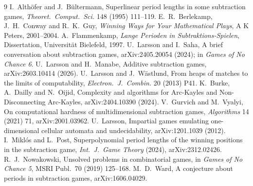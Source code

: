\begin{thebibliography}{9}
 I.~Althöfer and J.~Bültermann, Superlinear period lengths in some subtraction games,
\emph{Theoret.\ Comput.\ Sci.} 148 (1995) 111--119.
 E.~R.~Berlekamp, J.~H.~Conway and R.~K.~Guy, \emph{Winning Ways for Your Mathematical
Plays}, A K Peters, 2001--2004.
 A.~Flammenkamp, \emph{Lange Perioden in Subtraktions-Spielen}, Dissertation,
Universität Bielefeld, 1997.
 U.~Larsson and I.~Saha, A brief conversation about subtraction games,
arXiv:2405.20054 (2024); in \emph{Games of No Chance 6}.
 U.~Larsson and H.~Manabe, Additive subtraction games, arXiv:2603.10414 (2026).
 U.~Larsson and J.~Wästlund, From heaps of matches to the limits of computability,
\emph{Electron.\ J.\ Combin.} 20 (2013) P41.
 K.~Burke, A.~Dailly and N.~Oijid, Complexity and algorithms for Arc-Kayles and
Non-Disconnecting Arc-Kayles, arXiv:2404.10390 (2024).
 V.~Gurvich and M.~Vyalyi, On computational hardness of multidimensional subtraction
games, \emph{Algorithms} 14 (2021) 71, arXiv:2001.03962.
 U.~Larsson, Impartial games emulating one-dimensional cellular automata and
undecidability, arXiv:1201.1039 (2012).
 I.~Miklós and L.~Post, Superpolynomial period lengths of the winning positions in the
subtraction game, \emph{Int.\ J.\ Game Theory} (2024), arXiv:2312.02426.
 R.~J.~Nowakowski, Unsolved problems in combinatorial games, in \emph{Games of
No Chance 5}, MSRI Publ.\ 70 (2019) 125--168.
 M.~D.~Ward, A conjecture about periods in subtraction games, arXiv:1606.04029.
\end{thebibliography}



